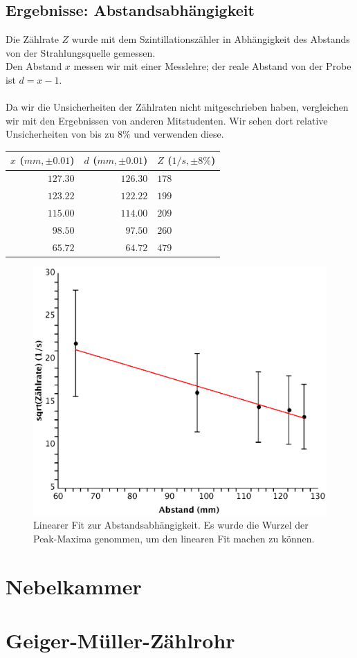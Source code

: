 \documentclass{article}
\begin{document}
\subsection{Ergebnisse: Abstandsabhängigkeit}
Die Zählrate $Z$ wurde mit dem Szintillationszähler in Abhängigkeit des Abstands von der Strahlungsquelle gemessen.\\
Den Abstand $x$ messen wir mit einer Messlehre; der reale Abstand von der Probe ist $d=x-1$.\\
\\
Da wir die Unsicherheiten der Zählraten nicht mitgeschrieben haben, vergleichen wir mit den Ergebnissen von anderen Mitstudenten. Wir sehen dort relative Unsicherheiten von bis zu $8\%$ und verwenden diese.
\\
\begin{center}
\begin{tabular}{|r|r||l|}
\hline
$x$ ($\si{mm}, \pm 0.01$) & $d$ ($\si{mm}, \pm 0.01$) & $Z$ ($1/s, \pm 8\% $)\\
\hline
$127.30$ & $126.30$ & $178$\\
$123.22$ & $122.22$ & $199$\\
$115.00$ & $114.00$ & $209$\\
$98.50$ & $97.50$ & $260$\\
$65.72$ & $64.72$ & $479$\\
\hline
\end{tabular}
\end{center}

\begin{center}
\begin{figure}[H]
\includegraphics[scale=0.6]{abstandwurzel.eps}
\caption{Linearer Fit zur Abstandsabhängigkeit. Es wurde die Wurzel der Peak-Maxima genommen, um den linearen Fit machen zu können.}
\end{figure}
\end{center}

\section{Nebelkammer}
\section{Geiger-Müller-Zählrohr}																							
\end{document}
